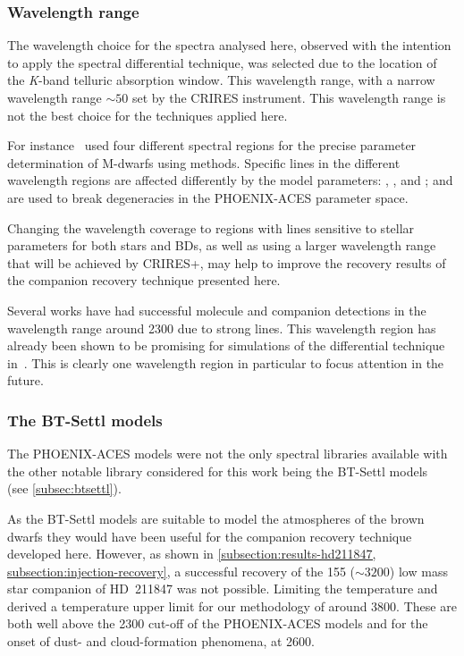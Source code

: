 \subsubsection {Wavelength range}
\label{subsubsec:wavelenght_range_limitation}
The wavelength choice for the spectra analysed here, observed with the intention to apply the spectral differential technique, was selected due to the location of the \emph{K}-band telluric absorption window.
This wavelength range, with a narrow wavelength range \(\sim50\)\nm{} set by the CRIRES instrument.
This wavelength range is not the best choice for the techniques applied here.

For instance~\citet{passegger_fundamental_2016} used four different spectral regions for the precise parameter determination of M-dwarfs using \textchisquared{} methods.
Specific lines in the different wavelength regions are affected differently by the model parameters: \Teff{}, \logg{}, and \feh{}; and are used to break degeneracies in the {PHOENIX-ACES} parameter space.

Changing the wavelength coverage to regions with lines sensitive to stellar parameters for both stars and {BD}s, as well as using a larger wavelength range that will be achieved by {CRIRES+}, may help to improve the recovery results of the companion recovery technique presented here.

Several works \citet[e.g.][]{brogi_carbon_2014, brogi_rotation_2016, piskorz_evidence_2016} have had successful molecule and companion detections in the wavelength range around 2300\nm{} due to strong  lines. This wavelength region has already been shown to be promising for simulations of the differential technique in~\citet{kostogryz_spectral_2013}.
This is clearly one wavelength region in particular to focus attention in the future.


\subsubsection{The {BT-Settl} models}
\label{subsubsec:bt-settl}
The {PHOENIX-ACES} models were not the only spectral libraries available with the other notable library considered for this work being the {BT-Settl} models~\citep{allard_model_2010,allard_btsettl_2013,baraffe_new_2015} (see \cref{subsec:btsettl}).

As the {BT-Settl} models are suitable to model the atmospheres of the brown dwarfs they would have been useful for the companion recovery technique developed here.
However, as shown in \cref{subsection:results-hd211847, subsection:injection-recovery}, a successful recovery of the 155\Mjup{} (\Teff{}\(\sim3200\)\K{}) low mass star companion of {HD~211847} was not possible. Limiting the temperature and derived a temperature upper limit for \textrm{our} methodology of around 3800\K{}.
These are both well above the 2300\K{} cut-off of the {PHOENIX-ACES} models and for the onset of dust- and cloud-formation phenomena, at 2600\K{}.

